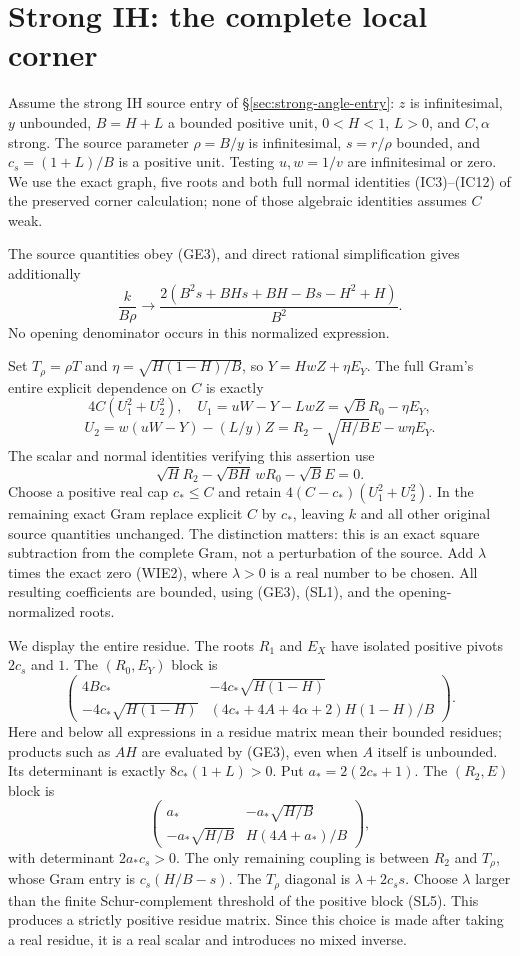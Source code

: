 \section{Strong IH: the complete local corner}
\label{sec:strong-ih-local}
Assume the strong IH source entry of \S\ref{sec:strong-angle-entry}:
$z$ is infinitesimal, $y$ unbounded, $B=H+L$ a bounded positive unit,
$0<H<1$, $L>0$, and $C,\alpha$ strong. The source parameter
$\rho=B/y$ is infinitesimal, $s=r/\rho$ bounded, and $c_s=(1+L)/B$
is a positive unit. Testing $u,w=1/v$ are infinitesimal or zero.
We use the exact graph, five roots and both full normal identities
(IC3)--(IC12) of the preserved corner calculation; none of those
algebraic identities assumes $C$ weak.

The source quantities obey (GE3), and direct rational simplification
gives additionally
\[
 \frac{k}{B\rho}\longrightarrow
 \frac{2(B^2s+BHs+BH-Bs-H^2+H)}{B^2}.
\tag{SL1}
\]
No opening denominator occurs in this normalized expression.

Set $T_\rho=\rho T$ and
$\eta=\sqrt{H(1-H)/B}$, so $Y=HwZ+\eta E_Y$.
The full Gram's entire explicit dependence on $C$ is exactly
\[
 4C(U_1^2+U_2^2),\quad
 U_1=uW-Y-LwZ=\sqrt B R_0-\eta E_Y,
\]
\[
 U_2=w(uW-Y)-(L/y)Z
       =R_2-\sqrt{H/B}E-w\eta E_Y.
\tag{SL2}
\]
The scalar and normal identities verifying this assertion use
\[
 \sqrt H R_2-\sqrt{BH}\,wR_0-\sqrt B E=0.
\tag{SL3}
\]
Choose a positive real cap $c_*\le C$ and retain
$4(C-c_*)(U_1^2+U_2^2)$. In the remaining exact Gram replace explicit
$C$ by $c_*$, leaving $k$ and all other original source quantities
unchanged. The distinction matters: this is an exact square
subtraction from the complete Gram, not a perturbation of the source.
Add $\lambda$ times the exact zero (WIE2), where $\lambda>0$ is a
real number to be chosen. All resulting coefficients are bounded,
using (GE3), (SL1), and the opening-normalized roots.

We display the entire residue. The roots $R_1$ and $E_X$ have isolated
positive pivots $2c_s$ and $1$. The $(R_0,E_Y)$ block is
\[
 \begin{pmatrix}
 4Bc_*&-4c_*\sqrt{H(1-H)}\\
 -4c_*\sqrt{H(1-H)}&
 (4c_*+4A+4\alpha+2)H(1-H)/B
 \end{pmatrix}.
\tag{SL4}
\]
Here and below all expressions in a residue matrix mean their bounded
residues; products such as $AH$ are evaluated by (GE3), even when
$A$ itself is unbounded. Its determinant is exactly $8c_*(1+L)>0$.
Put $a_*=2(2c_*+1)$. The $(R_2,E)$ block is
\[
 \begin{pmatrix}
 a_*&-a_*\sqrt{H/B}\\
 -a_*\sqrt{H/B}&H(4A+a_*)/B
 \end{pmatrix},
\tag{SL5}
\]
with determinant $2a_*c_s>0$. The only remaining coupling is between
$R_2$ and $T_\rho$, whose Gram entry is
$c_s(H/B-s)$. The $T_\rho$ diagonal is $\lambda+2c_s s$.
Choose $\lambda$ larger than the finite Schur-complement threshold
of the positive block (SL5). This produces a strictly positive
residue matrix. Since this choice is made after taking a real
residue, it is a real scalar and introduces no mixed inverse.

